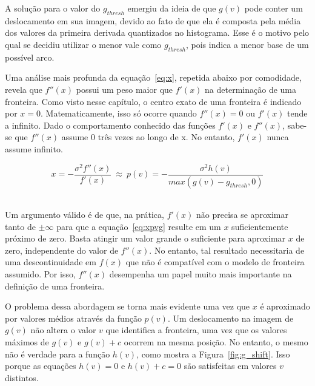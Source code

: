 	A solução para o valor do $ g_{thresh} $ emergiu da ideia de que $ g(v) $ pode conter um deslocamento em sua imagem, devido ao fato de que ela é composta pela média dos valores da primeira derivada quantizados no histograma. Esse é o motivo pelo qual se decidiu utilizar o menor vale como $ g_{thresh} $, pois indica a menor base de um possível arco.
	
    Uma análise mais profunda da equação~\eqref{eq:x}, repetida abaixo por comodidade, revela que $ f''(x) $ possui um peso maior que $ f'(x) $ na determinação de uma fronteira. Como visto nesse capítulo, o centro exato de uma fronteira é indicado por $ x = 0 $. Matematicamente, isso só ocorre quando $ f''(x) = 0 $ ou $ f'(x) $ tende a infinito. Dado o comportamento conhecido das funções $ f'(x) $ e $ f''(x) $, sabe-se que $ f''(x) $ assume $ 0 $ três vezes ao longo de x. No entanto, $ f'(x) $ nunca assume infinito.
    
\begin{equation} \label{eq:xpvg}
	x = -\frac{\sigma^{2}f''(x)}{f'(x)} \ \approx \ 
	p(v) = -\frac{\sigma^{2}h(v)}{max(g(v) - g_{thresh}, 0)}
\end{equation} \

	Um argumento válido é de que, na prática, $ f'(x) $ não precisa se aproximar tanto de $ \pm \infty $ para que a equação~\eqref{eq:xpvg} resulte em um $ x $ suficientemente próximo de zero. Basta atingir um valor grande o suficiente para aproximar $ x $ de zero, independente do valor de $ f''(x) $. No entanto, tal resultado necessitaria de uma descontinuidade em $ f(x) $ que não é compatível com o modelo de fronteira assumido. Por isso, $ f''(x) $ desempenha um papel muito mais importante na definição de uma fronteira.
	
	O problema dessa abordagem se torna mais evidente uma vez que $ x $ é aproximado por valores médios através da função $ p(v) $. Um deslocamento na imagem de $ g(v) $ não altera o valor $ v $ que identifica a fronteira, uma vez que os valores máximos de $ g(v) $ e $ g(v) + c $ ocorrem na mesma posição. No entanto, o mesmo não é verdade para a função $ h(v) $, como mostra a Figura~\ref{fig:g_shift}. Isso porque as equações $ h(v) = 0 $ e $ h(v) + c = 0 $ são satisfeitas em valores $ v $ distintos.
	
